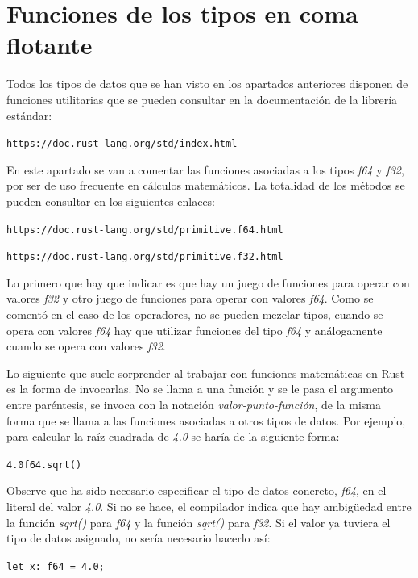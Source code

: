 \section{Funciones de los tipos en coma flotante}
Todos los tipos de datos que se han visto en los apartados anteriores disponen de funciones utilitarias que se pueden consultar en la documentación de la librería estándar:

{\centering \texttt{https://doc.rust-lang.org/std/index.html} \par}

En este apartado se van a comentar las funciones asociadas a los tipos \textit{f64} y \textit{f32}, por ser de uso frecuente en cálculos matemáticos. La totalidad de los métodos se pueden consultar en los siguientes enlaces:

{\centering \texttt{https://doc.rust-lang.org/std/primitive.f64.html} \par}

{\centering \texttt{https://doc.rust-lang.org/std/primitive.f32.html} \par}

Lo primero que hay que indicar es que hay un juego de funciones para operar con valores \textit{f32} y otro juego de funciones para operar con valores \textit{f64}. Como se comentó en el caso de los operadores, no se pueden mezclar tipos, cuando se opera con valores \textit{f64} hay que utilizar funciones del tipo \textit{f64} y análogamente cuando se opera con valores \textit{f32}.

Lo siguiente que suele sorprender al trabajar con funciones matemáticas en Rust es la forma de invocarlas. No se llama a una función y se le pasa el argumento entre paréntesis, se invoca con la notación \textit{valor-punto-función}, de la misma forma que se llama a las funciones asociadas a otros tipos de datos. Por ejemplo, para calcular la raíz cuadrada de \textit{4.0} se haría de la siguiente forma:

{\hspace{5em} \texttt{4.0f64.sqrt()} \par}

Observe que ha sido necesario especificar el tipo de datos concreto, \textit{f64}, en el literal del valor \textit{4.0}. Si no se hace, el compilador indica que hay ambigüedad entre la función \textit{sqrt()} para \textit{f64} y la función \textit{sqrt()} para \textit{f32}. Si el valor ya tuviera el tipo de datos asignado, no sería necesario hacerlo así:

{\hspace{5em} \texttt{let x: f64 = 4.0;} \par}

